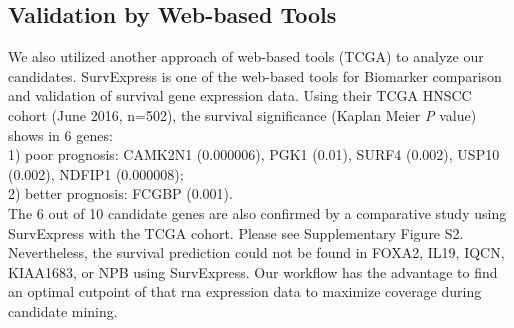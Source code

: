 \documentclass[jpm,article,submit,moreauthors,pdftex]{Definitions/mdpi}
\begin{document}
\begin{paracol}{2}
\subsection{Validation by Web-based Tools}
We also utilized another approach of web-based tools (TCGA) to analyze our candidates.
SurvExpress\cite{Aguirre-Gamboa2013} is one of the web-based tools for Biomarker comparison and validation of survival gene expression data. Using their TCGA HNSCC cohort (June 2016, n=502), the survival significance (Kaplan Meier \textit{P} value) shows in 6 genes:\\ %
1) poor prognosis: CAMK2N1 (0.000006), PGK1 (0.01), SURF4 (0.002), USP10 (0.002), NDFIP1 (0.000008);\\
2) better prognosis: FCGBP (0.001).\\
The 6 out of 10 candidate genes are also confirmed by a comparative study using SurvExpress with the TCGA cohort. Please see Supplementary Figure S2.%
Nevertheless, the survival prediction could not be found in FOXA2, IL19, IQCN, KIAA1683, or NPB using SurvExpress.
Our workflow has the advantage to find an optimal cutpoint of that \acrshort{rna} expression data to maximize coverage during candidate mining.


\end{paracol}
\end{document}
